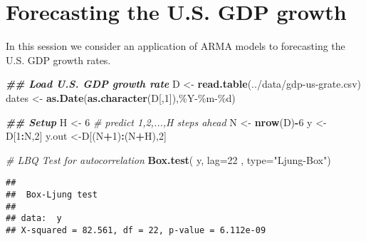 \documentclass[
]{book}
\newenvironment{Shaded}{\begin{snugshade}}{\end{snugshade}}
\newcommand{\AttributeTok}[1]{\textcolor[rgb]{0.13,0.29,0.53}{#1}}
\newcommand{\CommentTok}[1]{\textcolor[rgb]{0.56,0.35,0.01}{\textit{#1}}}
\newcommand{\DecValTok}[1]{\textcolor[rgb]{0.00,0.00,0.81}{#1}}
\newcommand{\DocumentationTok}[1]{\textcolor[rgb]{0.56,0.35,0.01}{\textbf{\textit{#1}}}}
\newcommand{\FunctionTok}[1]{\textcolor[rgb]{0.13,0.29,0.53}{\textbf{#1}}}
\newcommand{\NormalTok}[1]{#1}
\newcommand{\OtherTok}[1]{\textcolor[rgb]{0.56,0.35,0.01}{#1}}
\newcommand{\SpecialCharTok}[1]{\textcolor[rgb]{0.81,0.36,0.00}{\textbf{#1}}}
\newcommand{\StringTok}[1]{\textcolor[rgb]{0.31,0.60,0.02}{#1}}
\begin{document}
\hypertarget{forecasting-the-u.s.-gdp-growth}{%
\section{Forecasting the U.S. GDP growth}\label{forecasting-the-u.s.-gdp-growth}}

In this session we consider an application of ARMA models to forecasting the U.S. GDP growth rates.

\begin{Shaded}
\begin{Highlighting}[]
\DocumentationTok{\#\# Load U.S. GDP growth rate}
\NormalTok{D }\OtherTok{\textless{}{-}} \FunctionTok{read.table}\NormalTok{(}\StringTok{\textquotesingle{}../data/gdp{-}us{-}grate.csv\textquotesingle{}}\NormalTok{)}
\NormalTok{dates }\OtherTok{\textless{}{-}} \FunctionTok{as.Date}\NormalTok{(}\FunctionTok{as.character}\NormalTok{(D[,}\DecValTok{1}\NormalTok{]),}\StringTok{\textquotesingle{}\%Y{-}\%m{-}\%d\textquotesingle{}}\NormalTok{)}

\DocumentationTok{\#\# Setup }
\NormalTok{H }\OtherTok{\textless{}{-}} \DecValTok{6}   \CommentTok{\# predict 1,2,...,H steps ahead}
\NormalTok{N }\OtherTok{\textless{}{-}} \FunctionTok{nrow}\NormalTok{(D)}\SpecialCharTok{{-}}\DecValTok{6}
\NormalTok{y }\OtherTok{\textless{}{-}}\NormalTok{ D[}\DecValTok{1}\SpecialCharTok{:}\NormalTok{N,}\DecValTok{2}\NormalTok{]}
\NormalTok{y.out }\OtherTok{\textless{}{-}}\NormalTok{D[(N}\SpecialCharTok{+}\DecValTok{1}\NormalTok{)}\SpecialCharTok{:}\NormalTok{(N}\SpecialCharTok{+}\NormalTok{H),}\DecValTok{2}\NormalTok{]}
\end{Highlighting}
\end{Shaded}

\begin{Shaded}
\begin{Highlighting}[]
\CommentTok{\# LBQ Test for autocorrelation}
\FunctionTok{Box.test}\NormalTok{( y, }\AttributeTok{lag=}\DecValTok{22}\NormalTok{ , }\AttributeTok{type=}\StringTok{"Ljung{-}Box"}\NormalTok{)}
\end{Highlighting}
\end{Shaded}

\begin{verbatim}
## 
##  Box-Ljung test
## 
## data:  y
## X-squared = 82.561, df = 22, p-value = 6.112e-09
\end{verbatim}
\end{document}
